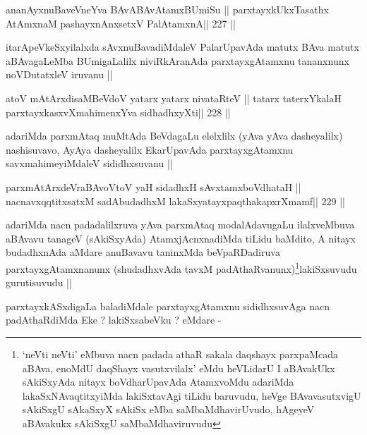 \begin{shl}
ananAyxnuBaveVneYva BAvABAvAtamxBUmiSu ||
parxtayxkUkxTasathx AtAmxnaM pashayxnAnxsetxV PalAtamxnA\hfill || 227 ||
\end{shl}

\begin{artha}
itarApeVkeSxyilalxda sAvxnuBavadiMdaleV PalarUpavAda matutx BAva
matutx aBAvagaLeMba BUmigaLalilx niviRkAranAda parxtayxgAtamxnu
tananxnunx noVDutatxleV iruvanu ||
\end{artha}


\begin{shl}
atoV mAtArxdisaMBeVdoV yatarx yatarx nivataRteV ||
tatarx \footnotemark[1]taterxYkalaH parxtayxkasxvXmahimenxYva sidhadhxyXti\hfill || 228 ||
\end{shl}

\begin{artha}
adariMda parxmAtaq muMtAda BeVdagaLu elelxlilx (yAva yAva dasheyalilx)
nashisuvavo, AyAya dasheyalilx EkarUpavAda parxtayxgAtamxnu
savxmahimeyiMdaleV sididhxsuvanu ||
\end{artha}


\begin{shl}
parxmAtArxdeVraBAvoV\s toV yaH sidadhxH sAvxtamxboVdhataH ||
nacnavxqqtitxsatxM sadAbudadhxM lakaSxyatayxpaqthakapxrXmamf\hfill || 229 ||
\end{shl}

\begin{artha}
adariMda nacn padadalilxruva yAva parxmAtaq modalAdavugaLu
ilalxveMbuva aBAvavu tanageV (sAkiSxyAda) AtamxjAcnxnadiMda tiLidu
baMdito, A nitayx budadhxnAda aMdare anuBavavu taninxMda
beVpaRDadiruva parxtayxgAtamxnanunx (shudadhxvAda
tavxM padAthaRvanunx)\footnote[1]{`neVti neVti' eMbuva nacn padada
  athaR sakala daqshayx parxpaMcada aBAva, enoMdU daqShayx
  vasutxvilalx' eMdu heVLidarU I aBAvakUkx sAkiSxyAda nitayx
  boVdharUpavAda AtamxvoMdu adariMda lakaSxNAvaqtitxyiMda lakiSxtavAgi
tiLidu baruvudu, heVge BAvavasutxvigU sAkiSxgU sAkaSxyX sAkiSx eMba
saMbaMdhavirUvudo, hAgeyeV aBAvakukx sAkiSxgU saMbaMdhaviruvudu}lakiSxsuvudu
gurutisuvudu ||
\end{artha}

\begin{artha}
parxtayxkASxdigaLa baladiMdale parxtayxgAtamxnu sididhxsuvAga nacn
padAthaRdiMda Eke ? lakiSxsabeVku ? eMdare -
\end{artha}

